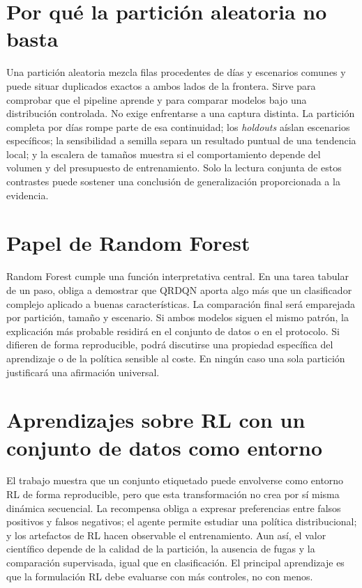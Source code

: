 \section{Por qué la partición aleatoria no basta}

Una partición aleatoria mezcla filas procedentes de días y escenarios comunes y puede situar duplicados exactos a ambos lados de la frontera. Sirve para comprobar que el pipeline aprende y para comparar modelos bajo una distribución controlada. No exige enfrentarse a una captura distinta. La partición completa por días rompe parte de esa continuidad; los \emph{holdouts} aíslan escenarios específicos; la sensibilidad a semilla separa un resultado puntual de una tendencia local; y la escalera de tamaños muestra si el comportamiento depende del volumen y del presupuesto de entrenamiento. Solo la lectura conjunta de estos contrastes puede sostener una conclusión de generalización proporcionada a la evidencia.

\section{Papel de Random Forest}

Random Forest cumple una función interpretativa central. En una tarea tabular de un paso, obliga a demostrar que QRDQN aporta algo más que un clasificador complejo aplicado a buenas características. La comparación final será emparejada por partición, tamaño y escenario. Si ambos modelos siguen el mismo patrón, la explicación más probable residirá en el conjunto de datos o en el protocolo. Si difieren de forma reproducible, podrá discutirse una propiedad específica del aprendizaje o de la política sensible al coste. En ningún caso una sola partición justificará una afirmación universal.

\section{Aprendizajes sobre RL con un conjunto de datos como entorno}

El trabajo muestra que un conjunto etiquetado puede envolverse como entorno RL de forma reproducible, pero que esta transformación no crea por sí misma dinámica secuencial. La recompensa obliga a expresar preferencias entre falsos positivos y falsos negativos; el agente permite estudiar una política distribucional; y los artefactos de RL hacen observable el entrenamiento. Aun así, el valor científico depende de la calidad de la partición, la ausencia de fugas y la comparación supervisada, igual que en clasificación. El principal aprendizaje es que la formulación RL debe evaluarse con más controles, no con menos.

